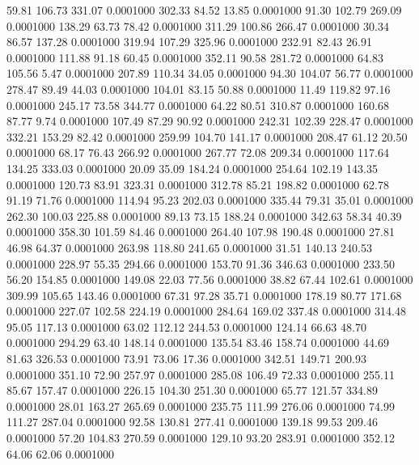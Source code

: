   59.81  106.73  331.07   0.0001000
 302.33   84.52   13.85   0.0001000
  91.30  102.79  269.09   0.0001000
 138.29   63.73   78.42   0.0001000
 311.29  100.86  266.47   0.0001000
  30.34   86.57  137.28   0.0001000
 319.94  107.29  325.96   0.0001000
 232.91   82.43   26.91   0.0001000
 111.88   91.18   60.45   0.0001000
 352.11   90.58  281.72   0.0001000
  64.83  105.56    5.47   0.0001000
 207.89  110.34   34.05   0.0001000
  94.30  104.07   56.77   0.0001000
 278.47   89.49   44.03   0.0001000
 104.01   83.15   50.88   0.0001000
  11.49  119.82   97.16   0.0001000
 245.17   73.58  344.77   0.0001000
  64.22   80.51  310.87   0.0001000
 160.68   87.77    9.74   0.0001000
 107.49   87.29   90.92   0.0001000
 242.31  102.39  228.47   0.0001000
 332.21  153.29   82.42   0.0001000
 259.99  104.70  141.17   0.0001000
 208.47   61.12   20.50   0.0001000
  68.17   76.43  266.92   0.0001000
 267.77   72.08  209.34   0.0001000
 117.64  134.25  333.03   0.0001000
  20.09   35.09  184.24   0.0001000
 254.64  102.19  143.35   0.0001000
 120.73   83.91  323.31   0.0001000
 312.78   85.21  198.82   0.0001000
  62.78   91.19   71.76   0.0001000
 114.94   95.23  202.03   0.0001000
 335.44   79.31   35.01   0.0001000
 262.30  100.03  225.88   0.0001000
  89.13   73.15  188.24   0.0001000
 342.63   58.34   40.39   0.0001000
 358.30  101.59   84.46   0.0001000
 264.40  107.98  190.48   0.0001000
  27.81   46.98   64.37   0.0001000
 263.98  118.80  241.65   0.0001000
  31.51  140.13  240.53   0.0001000
 228.97   55.35  294.66   0.0001000
 153.70   91.36  346.63   0.0001000
 233.50   56.20  154.85   0.0001000
 149.08   22.03   77.56   0.0001000
  38.82   67.44  102.61   0.0001000
 309.99  105.65  143.46   0.0001000
  67.31   97.28   35.71   0.0001000
 178.19   80.77  171.68   0.0001000
 227.07  102.58  224.19   0.0001000
 284.64  169.02  337.48   0.0001000
 314.48   95.05  117.13   0.0001000
  63.02  112.12  244.53   0.0001000
 124.14   66.63   48.70   0.0001000
 294.29   63.40  148.14   0.0001000
 135.54   83.46  158.74   0.0001000
  44.69   81.63  326.53   0.0001000
  73.91   73.06   17.36   0.0001000
 342.51  149.71  200.93   0.0001000
 351.10   72.90  257.97   0.0001000
 285.08  106.49   72.33   0.0001000
 255.11   85.67  157.47   0.0001000
 226.15  104.30  251.30   0.0001000
  65.77  121.57  334.89   0.0001000
  28.01  163.27  265.69   0.0001000
 235.75  111.99  276.06   0.0001000
  74.99  111.27  287.04   0.0001000
  92.58  130.81  277.41   0.0001000
 139.18   99.53  209.46   0.0001000
  57.20  104.83  270.59   0.0001000
 129.10   93.20  283.91   0.0001000
 352.12   64.06   62.06   0.0001000
